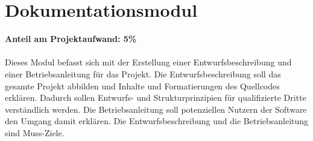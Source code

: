 \section{Dokumentationsmodul}
\textbf{Anteil am Projektaufwand: 5\%}\\ \\
Dieses Modul befasst sich mit der Erstellung einer Entwurfsbeschreibung und einer Betriebsanleitung für das Projekt. Die Entwurfsbeschreibung soll das gesamte Projekt abbilden und Inhalte und Formatierungen des Quellcodes erklären. Dadurch sollen Entwurfs- und Strukturprinzipien für qualifizierte Dritte verständlich werden. Die Betriebsanleitung soll potenziellen Nutzern der Software den Umgang damit erklären. Die Entwurfsbeschreibung und die Betriebsanleitung sind Muss-Ziele.  
